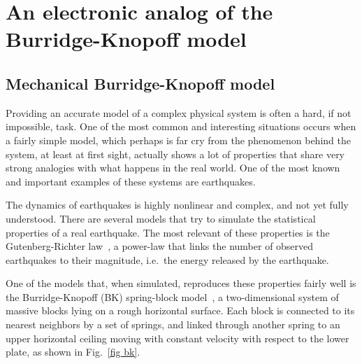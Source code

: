 \chapter{An electronic analog of the Burridge-Knopoff model}\label{chap: electronic analog of bk}

\section{Mechanical Burridge-Knopoff model}\label{sec: mechanical bk}

Providing an accurate model of a complex physical system is often a hard, if not
impossible, task. One of the most common and interesting situations occurs when a
fairly simple model, which perhaps is far cry from the phenomenon
behind the system, at least at first sight, actually shows a lot of properties that share
very strong analogies with what happens in the real world. One of the most known
and important examples of these systems are earthquakes.

The dynamics of earthquakes is highly nonlinear and complex, and not yet fully
understood. There are several models that try to simulate the statistical properties of
a real earthquake. The most relevant of these properties is the Gutenberg-Richter law~\cite{gutenberg1956energy},
a power-law that links the number of observed earthquakes to their magnitude,
i.e.\ the energy released by the earthquake.

One of the models that, when simulated, reproduces these properties fairly well is
the Burridge-Knopoff (BK) spring-block model~\cite{ref:bk}, a two-dimensional system of massive blocks
lying on a rough horizontal surface. Each block is connected to its nearest neighbors by a set of springs,
and linked through another spring to an upper horizontal ceiling moving with constant velocity with respect to the lower plate,
as shown in Fig.~\ref{fig bk}.

